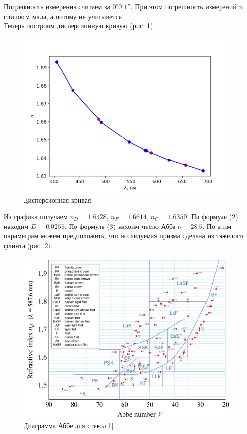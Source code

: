 \documentclass[a4paper,12pt]{article}
\begin{document}
\noindent
Погрешность измерения считаем за $0^\circ0'1''$. При этом погрешность измерений $n$ слишком мала, а потому не учитывется. \\
Теперь построим дисперсионную кривую (рис. 1). 

\begin{figure}[H]
    \centering
    \includegraphics[scale=0.9]{1.png}
    \caption{Дисперсионная кривая}
\end{figure}

\noindent
Из графика получаем $n_D = 1.6428$, $n_F = 1.6614$, $n_C = 1.6359$. По формуле (2) находим $D = 0.0255$. По формуле (3) нахоим число Аббе $\nu = 28.5$. По этим параметрам можем предположить, что исследуемая призма сделана из тяжелого флинта (рис. 2).

\begin{figure}[H]
    \centering
    \includegraphics[scale=0.4]{abbe.png}
    \caption{Диаграмма Аббе для стекол[1]}
\end{figure}
\end{document}
